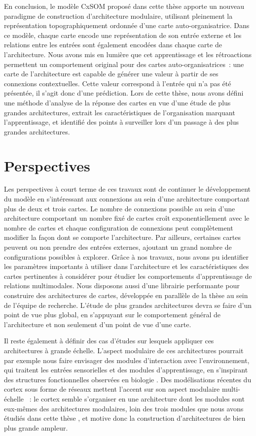 En conclusion, le modèle CxSOM proposé dans cette thèse apporte un nouveau paradigme de construction d'architecture modulaire, utilisant pleinement la représentation topographiquement ordonnée d'une carte auto-organisatrice.
Dans ce modèle, chaque carte encode une représentation de son entrée externe et les relations entre les entrées sont également encodées dans chaque carte de l'architecture. 
Nous avons mis en lumière que cet apprentissage et les rétroactions permettent un comportement original pour des cartes auto-organisatrices~: une carte de l'architecture est capable de générer une valeur à partir de ses connexions contextuelles. Cette valeur correspond à l'entrée qui n'a pas été présentée, il s'agit donc d'une prédiction.
Lors de cette thèse, nous avons défini une méthode d'analyse de la réponse des cartes en vue d'une étude de plus grandes architectures, extrait les caractéristiques de l'organisation marquant l'apprentissage, et identifié des points à surveiller lors d'un passage à des plus grandes architectures.

\section*{Perspectives}

Les perspectives à court terme de ces travaux sont de continuer le développement du modèle en s'intéressant aux connexions au sein d'une architecture comportant plus de deux et trois cartes.
Le nombre de connexions possible au sein d'une architecture comportant un nombre fixé de cartes croît exponentiellement avec le nombre de cartes et chaque configuration de connexions peut complètement modifier la façon dont se comporte l'architecture. Par ailleurs, certaines cartes peuvent ou non prendre des entrées externes, ajoutant un grand nombre de configurations possibles à explorer.
Grâce à nos travaux, nous avons pu identifier les paramètres importants à utiliser dans l'architecture et les caractéristiques des cartes pertinentes à considérer pour étudier les comportements d'apprentissage de relations multimodales. 
Nous disposons aussi d'une librairie performante pour construire des architectures de cartes, développée en parallèle de la thèse au sein de l'équipe de recherche.
L'étude de plus grandes architectures devra se faire d'un point de vue plus global, en s'appuyant sur le comportement général de l'architecture et non seulement d'un point de vue d'une carte. 

Il reste également à définir des cas d'études sur lesquels appliquer ces architectures à grande échelle.
L'aspect modulaire de ces architectures pourrait par exemple nous faire envisager des modules d'interaction avec l'environnement, qui traitent les entrées sensorielles et des modules d'apprentissage, en s'inspirant des structures fonctionnelles observées en biologie \parencite{Ellefsen2015NeuralMH}. 
Des modélisations récentes du cortex sous forme de réseaux mettent l'accent sur son aspect modulaire multi-échelle \parencite{betzel_multi-scale_2017}~: le cortex semble s'organiser en une architecture dont les modules sont eux-mêmes des architectures modulaires, loin des trois modules que nous avons étudiés dans cette thèse , et motive donc la construction d'architectures de bien plus grande ampleur.

